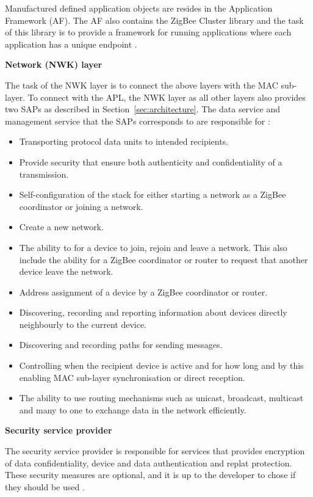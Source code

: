 Manufactured defined application objects are resides in the Application Framework (AF). The AF also contains the ZigBee Cluster library and the task of this library is to provide a framework for running applications where each application has a unique endpoint \citep{gislason2008zigbee}.

\vspace{5mm}
\textbf{Network (NWK) layer}

The task of the NWK layer is to connect the above layers with the MAC sub-layer. To connect with the APL, the NWK layer as all other layers also provides two SAPs as described in Section~\ref{sec:architecture}. The data service and management service that the SAPs corresponds to are responsible for \citep{farahani2011zigbee, zigbee2007spec}:

\begin{itemize}
   \item Transporting protocol data units to intended recipients.
   \item Provide security that ensure both authenticity and confidentiality of a transmission.
   \item Self-configuration of the stack for either starting a network as a ZigBee coordinator or joining a network.
   \item Create a new network. 
   \item The ability to for a device to join, rejoin and leave a network. This also include the ability for a ZigBee coordinator or router to request that another device leave the network.
   \item Address assignment of a device by a ZigBee coordinator or router.
   \item Discovering, recording and reporting information about devices directly neighbourly to the current device.
  \item Discovering and recording paths for sending messages.
  \item Controlling when the recipient device is active and for how long and by this enabling MAC sub-layer synchronisation or direct reception.
  \item The ability to use routing mechanisms such as unicast, broadcast, multicast and many to one to exchange data in the network efficiently.
\end{itemize}

\vspace{5mm}
\textbf{Security service provider}

The security service provider is responsible for services that provides encryption of data confidentiality, device and data authentication and replat protection. These security measures are optional, and it is up to the developer to chose if they should be used \citep{farahani2011zigbee}.

